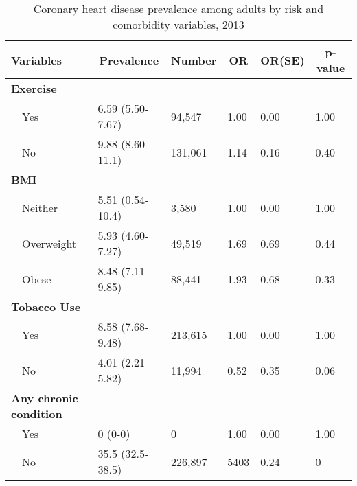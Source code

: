  
\begin{table}[H]
\caption{Coronary heart disease prevalence  among adults by risk and comorbidity variables, 2013\label{tab:riskComo.tabl}} 
\begin{center}
\begin{tabular}{llllll}
\hline\hline
\multicolumn{1}{l}{Variables}&\multicolumn{1}{c}{Prevalence}&\multicolumn{1}{c}{Number}&\multicolumn{1}{c}{OR}&\multicolumn{1}{c}{OR(SE)}&\multicolumn{1}{c}{p-value}\tabularnewline
\hline
{\bfseries Exercise}&&&&&\tabularnewline
~~Yes&6.59 (5.50-7.67)& 94,547&1.00&0.00&1.00\tabularnewline
~~No&9.88 (8.60-11.1)&131,061&1.14&0.16&0.40\tabularnewline
\hline
{\bfseries BMI}&&&&&\tabularnewline
~~Neither&5.51 (0.54-10.4)& 3,580&1.00&0.00&1.00\tabularnewline
~~Overweight&5.93 (4.60-7.27)&49,519&1.69&0.69&0.44\tabularnewline
~~Obese&8.48 (7.11-9.85)&88,441&1.93&0.68&0.33\tabularnewline
\hline
{\bfseries Tobacco Use}&&&&&\tabularnewline
~~Yes&8.58 (7.68-9.48)&213,615&1.00&0.00&1.00\tabularnewline
~~No&4.01 (2.21-5.82)& 11,994&0.52&0.35&0.06\tabularnewline
\hline
{\bfseries Any chronic condition}&&&&&\tabularnewline
~~Yes&0 (0-0)&      0&1.00&0.00&1.00\tabularnewline
~~No&35.5 (32.5-38.5)&226,897&5403&0.24&0\tabularnewline
\hline
\end{tabular}\end{center}

\end{table}

 
 